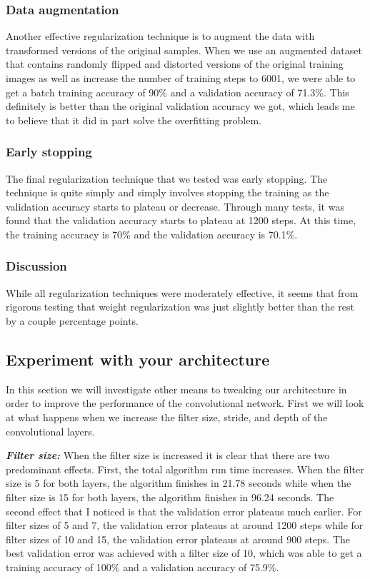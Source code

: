 \documentclass{article}
\begin{document}
\subsubsection{Data augmentation}
Another effective regularization technique is to augment the data with transformed versions of the original samples. When we use an augmented dataset that contains randomly flipped and distorted versions of the original training images as well as increase the number of training steps to 6001, we were able to get a batch training accuracy of 90\% and a validation accuracy of 71.3\%. This definitely is better than the original validation accuracy we got, which leads me to believe that it did in part solve the overfitting problem. 

\subsubsection{Early stopping}
The final regularization technique that we tested was early stopping. The technique is quite simply and simply involves stopping the training as the validation accuracy starts to plateau or decrease. Through many tests, it was found that the validation accuracy starts to plateau at 1200 steps. At this time, the training accuracy is 70\% and the validation accuracy is 70.1\%. 

\subsubsection{Discussion}
While all regularization techniques were moderately effective, it seems that from rigorous testing that weight regularization was just slightly better than the rest by a couple percentage points.

\subsection{Experiment with your architecture}
In this section we will investigate other means to tweaking our architecture in order to improve the performance of the convolutional network. First we will look at what happens when we increase the filter size, stride, and depth of the convolutional layers. 

\textbf{\textit{Filter size:}}
When the filter size is increased it is clear that there are two predominant effects. First, the total algorithm run time increases. When the filter size is 5 for both layers, the algorithm finishes in 21.78 seconds while when the filter size is 15 for both layers, the algorithm finishes in 96.24 seconds. The second effect that I noticed is that the validation error plateaus much earlier. For filter sizes of 5 and 7, the validation error plateaus at around 1200 steps while for filter sizes of 10 and 15, the validation error plateaus at around 900 steps. The best validation error was achieved with a filter size of 10, which was able to get a training accuracy of 100\% and a validation accuracy of 75.9\%.
\end{document}
